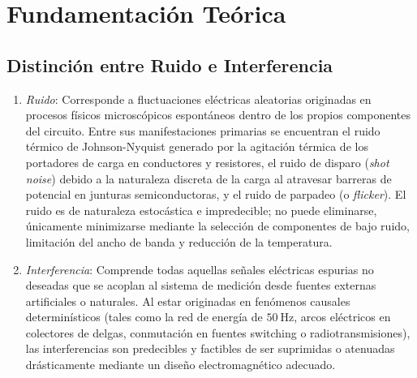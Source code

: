 \section{Fundamentación Teórica}

\subsection{Distinción entre Ruido e Interferencia}
\begin{enumerate}

    \item \emph{Ruido}: Corresponde a fluctuaciones eléctricas aleatorias
        originadas en procesos físicos microscópicos espontáneos dentro de los
        propios componentes del circuito. Entre sus manifestaciones primarias se
        encuentran el ruido térmico de Johnson-Nyquist generado por la agitación
        térmica de los portadores de carga en conductores y resistores, el ruido
        de disparo (\emph{shot noise}) debido a la naturaleza discreta de la
        carga al atravesar barreras de potencial en junturas semiconductoras, y
        el ruido de parpadeo (o \emph{flicker}). El ruido es de naturaleza
        estocástica e impredecible; no puede eliminarse, únicamente minimizarse
        mediante la selección de componentes de bajo ruido, limitación del ancho
        de banda y reducción de la temperatura.

    \item \emph{Interferencia}: Comprende todas aquellas señales eléctricas
        espurias no deseadas que se acoplan al sistema de medición desde fuentes
        externas artificiales o naturales. Al estar originadas en fenómenos
        causales determinísticos (tales como la red de energía de
        $\qty{50}{\hertz}$, arcos eléctricos en colectores de delgas,
        conmutación en fuentes switching o radiotransmisiones), las
        interferencias son predecibles y factibles de ser suprimidas o atenuadas
        drásticamente mediante un diseño electromagnético adecuado.
\end{enumerate}

